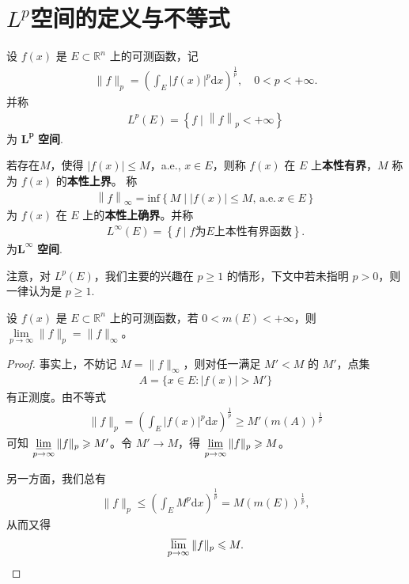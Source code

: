 \documentclass[../../main.tex]{subfiles}%
\begin{document}
\section{$L^p$空间的定义与不等式}

\begin{definition}[$L^p$空间]
设 $f(x)$ 是 $E\subset\mathbb{R}^n$ 上的可测函数，记
\begin{align*}
\|f\|_p = \left(\int_E |f(x)|^p \mathrm{d}x\right)^{\frac{1}{p}},\quad 0 < p < +\infty.
\end{align*}
并称
\begin{align*}
L^p\left( E \right) =\left\{ f\mid \left\| f \right\| _p<+\infty \right\} 
\end{align*}
为 $\boldsymbol{L}^{\boldsymbol{p}}$ \textbf{空间}.

若存在$M$，使得 $|f(x)| \leqslant M$，a.e., $x\in E$，则称 $f(x)$ 在 $E$ 上\textbf{本性有界}，$M$ 称为 $f(x)$ 的\textbf{本性上界}。
称
\begin{align*}
\left\| f \right\| _{\infty}=\mathrm{inf}\left\{ M\mid \left| f\left( x \right) \right|\leqslant M,\,\mathrm{a}.\mathrm{e}.\,x\in E \right\} 
\end{align*}
为 $f(x)$ 在 $E$ 上的\textbf{本性上确界}。并称
\begin{align*}
L^{\infty}\left( E \right) =\left\{ f\mid f\text{为}E\text{上本性有界函数} \right\} .
\end{align*}
为$\boldsymbol{L}^{\boldsymbol{\infty}}$ \textbf{空间}.
\end{definition}
\begin{remark}
注意，对 $L^p(E)$，我们主要的兴趣在 $p\geqslant 1$ 的情形，下文中若未指明 $p>0$，则一律认为是 $p\geqslant 1$.
\end{remark}

\begin{proposition}
设 $f(x)$ 是 $E\subset\mathbb{R}^n$ 上的可测函数，若 $0 < m(E) < +\infty$，则 $\lim\limits_{p\to\infty} \|f\|_p = \|f\|_\infty$。
\end{proposition}
\begin{proof}

事实上，不妨记 $M = \|f\|_\infty$，则对任一满足 $M' < M$ 的 $M'$，点集
\begin{align*}
A = \{x\in E: |f(x)| > M'\}
\end{align*}
有正测度。由不等式
\begin{align*}
\|f\|_p = \left(\int_E |f(x)|^p \mathrm{d}x\right)^{\frac{1}{p}} \geqslant M'(m(A))^{\frac{1}{p}}
\end{align*}
可知 $\varliminf\limits_{p\to\infty} \|f\|_p \geqslant M'$。令 $M'\to M$，得 $\varliminf\limits_{p\to\infty} \|f\|_p \geqslant M$。

另一方面，我们总有
\begin{align*}
\|f\|_p \leqslant \left(\int_E M^p \mathrm{d}x\right)^{\frac{1}{p}} = M(m(E))^{\frac{1}{p}},
\end{align*}
从而又得
\begin{align*}
\varlimsup\limits_{p\to\infty} \|f\|_p \leqslant M.
\end{align*}

\end{proof}
\end{document}
